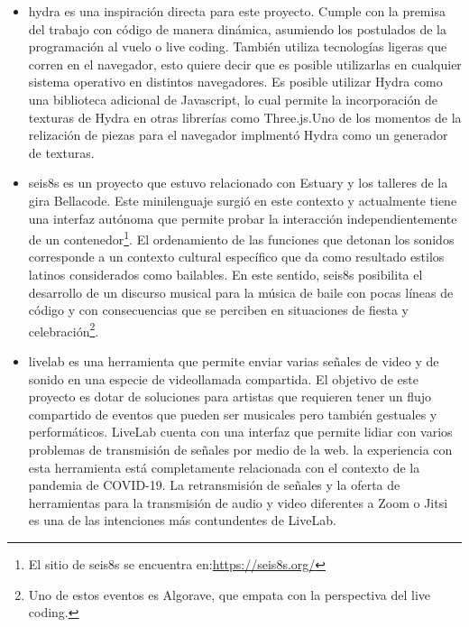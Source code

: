 \begin{itemize}
\item \Gls{hydra} es una inspiración directa para este proyecto. Cumple con la premisa del trabajo con código de manera dinámica, asumiendo los postulados de la programación al vuelo o live coding. También utiliza tecnologías ligeras que corren en el navegador, esto quiere decir que es posible utilizarlas en cualquier sistema operativo en distintos navegadores. Es posible utilizar Hydra como una biblioteca adicional de Javascript, lo cual permite la incorporación de texturas de Hydra en otras librerías como Three.js.Uno de los momentos de la relización de piezas para el navegador implmentó Hydra como un generador de texturas. 
\item \Gls{seis8s} es un proyecto que estuvo relacionado con Estuary y los talleres de la gira Bellacode. Este minilenguaje surgió en este contexto y actualmente tiene una interfaz autónoma que permite probar la interacción independientemente de un contenedor\footnote{El sitio de seis8s se encuentra en:\url{https://seis8s.org/}}. El ordenamiento de las funciones que detonan los sonidos corresponde a un contexto cultural específico que da como resultado estilos latinos considerados como bailables\citep{Angel2022Seis8s}. En este sentido, seis8s posibilita el desarrollo de un discurso musical para la música de baile con pocas líneas de código y con consecuencias que se perciben en situaciones de fiesta y celebración\footnote{Uno de estos eventos es Algorave, que empata con la perspectiva del live coding.}.
\item \Gls{livelab} es una herramienta que permite enviar varias señales de video y de sonido en una especie de videollamada compartida. El objetivo de este proyecto es dotar de soluciones para artistas que requieren tener un flujo compartido de eventos que pueden ser musicales pero también gestuales y performáticos. LiveLab cuenta con una interfaz que permite lidiar con varios problemas de transmisión de señales por medio de la web. la experiencia con esta herramienta está completamente relacionada con el contexto de la pandemia de COVID-19. La retransmisión de señales y la oferta de herramientas para la transmisión de audio y video diferentes a Zoom o Jitsi es una de las intenciones más contundentes de LiveLab.


\end{itemize}

